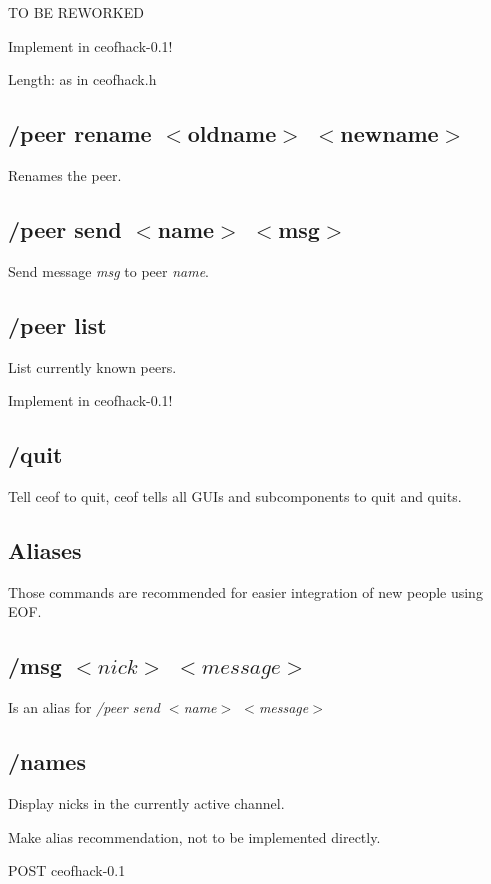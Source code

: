\documentclass[12pt,a4paper]{book}
\begin{document}
TO BE REWORKED

Implement in ceofhack-0.1!

Length: as in ceofhack.h
\subsection{/peer rename $<$oldname$>$ $<$newname$>$}
Renames the peer.
\subsection{/peer send $<$name$>$ $<$msg$>$}
Send message \textit{msg} to peer \textit{name}.
\subsection{/peer list}
List currently known peers.

Implement in ceofhack-0.1!
\subsection{/quit}
Tell ceof to quit, ceof tells all GUIs and subcomponents to quit and quits.

\subsection{Aliases}
Those commands are recommended for easier integration of new people using EOF.
\subsection{/msg $<nick>$ $<message>$}
Is an alias for \textit{/peer send $<$name$>$ $<$message$>$}
\subsection{/names}
Display nicks in the currently active channel.

Make alias recommendation, not to be implemented directly.

POST ceofhack-0.1
\end{document}

